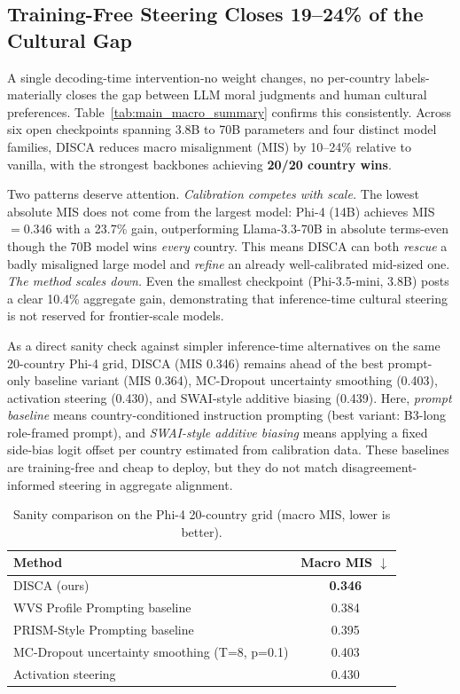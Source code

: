 \documentclass{article}
\begin{document}
\subsection{Training-Free Steering Closes 19--24\% of the Cultural Gap}

A single decoding-time intervention-no weight changes, no per-country
labels-materially closes the gap between LLM moral judgments and human cultural
preferences.
Table~\ref{tab:main_macro_summary} confirms this consistently.
Across six open checkpoints spanning 3.8B to 70B parameters and four distinct
model families, DISCA reduces macro misalignment (MIS) by 10--24\% relative to
vanilla, with the strongest backbones achieving \textbf{20/20 country wins}.

Two patterns deserve attention.
\emph{Calibration competes with scale.}
The lowest absolute MIS does not come from the largest model: Phi-4 (14B) achieves
MIS~$=0.346$ with a 23.7\% gain, outperforming Llama-3.3-70B in absolute terms-even
though the 70B model wins \emph{every} country.
This means DISCA can both \emph{rescue} a badly misaligned large model and
\emph{refine} an already well-calibrated mid-sized one.
\emph{The method scales down.}
Even the smallest checkpoint (Phi-3.5-mini, 3.8B) posts a clear 10.4\% aggregate
gain, demonstrating that inference-time cultural steering is not reserved for
frontier-scale models.

As a direct sanity check against simpler inference-time alternatives on the
same 20-country Phi-4 grid, DISCA (MIS 0.346) remains ahead of the best
prompt-only baseline variant (MIS 0.364), MC-Dropout uncertainty smoothing
(0.403), activation steering (0.430), and SWAI-style additive biasing (0.439).
Here, \emph{prompt baseline} means country-conditioned instruction prompting
(best variant: B3-long role-framed prompt), and \emph{SWAI-style additive
biasing} means applying a fixed side-bias logit offset per country estimated
from calibration data. These baselines are training-free and cheap to deploy,
but they do not match disagreement-informed steering in aggregate alignment.

\begin{table}[t]
\caption{Sanity comparison on the Phi-4 20-country grid
(macro MIS, lower is better).}
\label{tab:main_baseline_sanity}
\centering\scriptsize
\setlength{\tabcolsep}{6pt}
\begin{tabular}{lc}
\toprule
Method & Macro MIS $\downarrow$ \\
\midrule
DISCA (ours) & \textbf{0.346} \\
WVS Profile Prompting baseline & 0.384 \\
PRISM-Style Prompting baseline & 0.395 \\
MC-Dropout uncertainty smoothing (T=8, p=0.1) & 0.403 \\
Activation steering & 0.430 \\
\bottomrule
\end{tabular}
\end{table}
\end{document}
